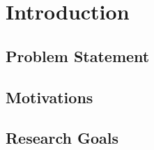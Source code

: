 \chapter{Introduction}\label{C:intro}

\section{Problem Statement}

\section{Motivations}

\section{Research Goals}

